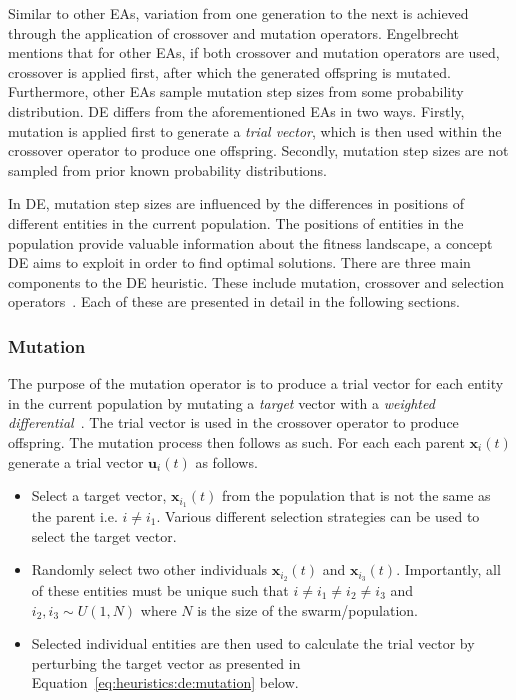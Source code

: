 Similar to other \acp{EA}, variation from one generation to the next is achieved through the application of crossover and mutation operators. Engelbrecht~\cite{ref:engelbrecht:2007} mentions that for other \acp{EA}, if both crossover and mutation operators are used, crossover is applied first, after which the generated offspring is mutated. Furthermore, other \acp{EA} sample mutation step sizes from some probability distribution. \acs{DE} differs from the aforementioned \acp{EA} in two ways. Firstly, mutation is applied first to generate a \textit{trial vector}, which is then used within the crossover operator to produce one offspring. Secondly, mutation step sizes are not sampled from prior known probability distributions.

In \acs{DE}, mutation step sizes are influenced by the differences in positions of different entities in the current population. The positions of entities in the population provide valuable information about the fitness landscape, a concept \acs{DE} aims to exploit in order to find optimal solutions. There are three main components to the \acs{DE} heuristic. These include mutation, crossover and selection operators~\cite{ref:price:2006}. Each of these are presented in detail in the following sections.

\subsubsection{Mutation}\label{sec:heuristics:mh:de:mutation}

The purpose of the mutation operator is to produce a trial vector for each entity in the current population by mutating a \textit{target} vector with a \textit{weighted differential}~\cite{ref:engelbrecht:2007}. The trial vector is used in the crossover operator to produce offspring. The mutation process then follows as such. For each each parent $\boldsymbol{x}_{i}(t)$ generate a trial vector $\boldsymbol{u}_{i}(t)$ as follows.

\begin{itemize}
      \item Select a target vector, $\boldsymbol{x}_{i_{1}}(t)$ from the population that is not the same as the parent i.e. $i \neq i_{1}$. Various different selection strategies can be used to select the target vector.

      \item Randomly select two other individuals $\boldsymbol{x}_{i_{2}}(t)$ and $\boldsymbol{x}_{i_{3}}(t)$. Importantly, all of these entities must be unique such that $i \neq i_{1} \neq i_{2} \neq i_{3}$ and $i_{2}, i_{3} \sim U(1, N)$ where $N$ is the size of the swarm/population.

      \item Selected individual entities are then used to calculate the trial vector by perturbing the target vector as presented in Equation~\eqref{eq:heuristics:de:mutation} below.
\end{itemize}



